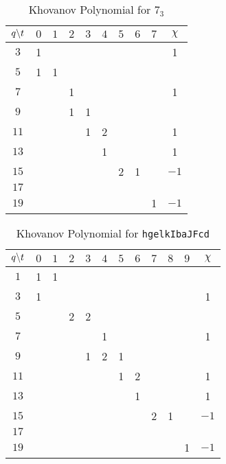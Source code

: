 \documentclass{article}
\theoremstyle{plain}
\begin{document}
        \begin{table}
            \centering
            \begin{tabular}{| c | c | c | c | c | c | c | c | c | c |}
                \hline
                $q\symbol{92}t$&$0$&$1$&$2$&$3$&$4$&$5$&$6$&$7$&$\chi$\\
                \hline
                $3$&1&&&&&&&&1\\
                \hline
                $5$&1&1&&&&&&&\\
                \hline
                $7$&&&1&&&&&&1\\
                \hline
                $9$&&&1&1&&&&&\\
                \hline
                $11$&&&&1&2&&&&1\\
                \hline
                $13$&&&&&1&&&&1\\
                \hline
                $15$&&&&&&2&1&&$-1$\\
                \hline
                $17$&&&&&&&&&\\
                \hline
                $19$&&&&&&&&1&$-1$\\
                \hline
            \end{tabular}
            \caption{Khovanov Polynomial for $7_{3}$}
        \end{table}
        \begin{table}
            \centering
            \begin{tabular}{| c | c | c | c | c | c | c | c | c | c | c | c |}
                \hline
                $q\symbol{92}t$&$0$&$1$&$2$&$3$&$4$&$5$&$6$&$7$&$8$&$9$&$\chi$\\
                \hline
                $1$&1&1&&&&&&&&&\\
                \hline
                $3$&1&&&&&&&&&&1\\
                \hline
                $5$&&&2&2&&&&&&&\\
                \hline
                $7$&&&&&1&&&&&&1\\
                \hline
                $9$&&&&1&2&1&&&&&\\
                \hline
                $11$&&&&&&1&2&&&&1\\
                \hline
                $13$&&&&&&&1&&&&1\\
                \hline
                $15$&&&&&&&&2&1&&$-1$\\
                \hline
                $17$&&&&&&&&&&&\\
                \hline
                $19$&&&&&&&&&&1&$-1$\\
                \hline
            \end{tabular}
            \caption{Khovanov Polynomial for \texttt{hgelkIbaJFcd}}
        \end{table}
\end{document}
